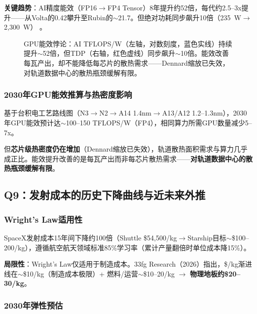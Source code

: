 \textbf{关键趋势}：AI精度能效（FP16$\rightarrow$FP4 Tensor）8年提升约52倍，每代约2.5--3x提升——从Volta的0.42攀升至Rubin的$\sim$21.7。但绝对功耗同步飙升10倍（235~W$\rightarrow$2{,}300~W）
\cite{nvidia2026rubin,spheron2026rubin,barrack2026rubin}。

\begin{figure}[H]
\centering

\caption{GPU能效悖论：AI TFLOPS/W（左轴，对数刻度，蓝色实线）持续提升$\sim$52倍，但TDP（右轴，红色虚线）同步飙升$\sim$10倍。能效改善每瓦产出，却不能降低每芯片的散热需求——Dennard缩放已失效，对轨道数据中心的散热瓶颈缓解有限。}
\label{fig:gpu_paradox}
\end{figure}

\subsubsection{2030年GPU能效推算与热密度影响}

基于台积电工艺路线图（N3$\rightarrow$N2$\rightarrow$A14 1.4nm$\rightarrow$A13/A12 1.2--1.3nm）\cite{tsmc2026symposium,fiisual2026tsmc}，2030年GPU能效预计达$\sim$100--150 TFLOPS/W（FP4），相同算力所需GPU数量减少5--7x。

但\textbf{芯片级热密度仍在增加}（Dennard缩放已失效），轨道散热面积需求与算力几乎成正比。能效提升改善的是每瓦产出而非每芯片散热需求——\textbf{对轨道数据中心的散热瓶颈缓解有限}。

\subsection{Q9：发射成本的历史下降曲线与近未来外推}

\subsubsection{Wright's Law适用性}

SpaceX发射成本15年间下降约100倍（Shuttle \$54,500/kg$\rightarrow$Starship目标$\sim$\$100--200/kg），遵循航空航天领域标准85\%学习率（累计产量翻倍时单位成本降15\%）\cite{nasalaunch2018}。

\textbf{局限性}：Wright's Law仅适用于制造成本。33fg Research（2026）指出，\$/kg渐进线在$\sim$\$10/kg（制造成本极限）+ 燃料/运营$\sim$\$10--20/kg $\rightarrow$ \textbf{物理地板约\$20--30/kg}\cite{33fg2026starship}。

\subsubsection{2030年弹性预估}

